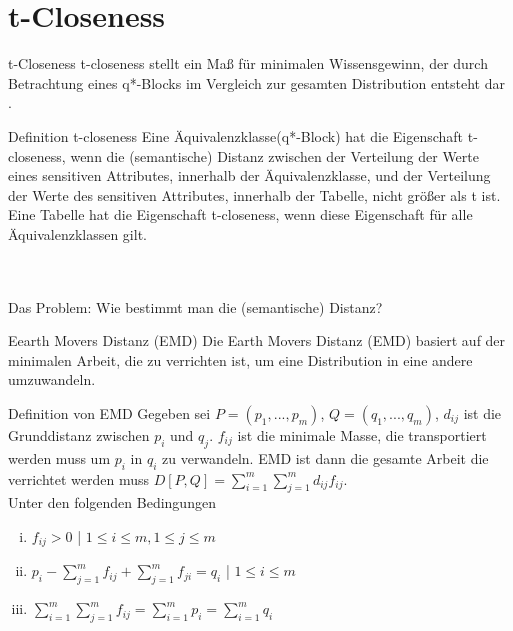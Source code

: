 \section{t-Closeness}

\begin{frame}{t-Closeness}
	t-closeness stellt ein Maß für minimalen Wissensgewinn, der durch Betrachtung eines q*-Blocks im Vergleich zur gesamten Distribution entsteht dar \cite{kltHauf}.
	\begin{block}{Definition t-closeness}
		Eine Äquivalenzklasse(q*-Block) hat die Eigenschaft t-closeness, wenn die (semantische) Distanz zwischen der Verteilung der Werte eines sensitiven Attributes, innerhalb der Äquivalenzklasse, und der Verteilung der Werte des sensitiven Attributes, innerhalb der Tabelle, nicht größer als t ist. Eine Tabelle hat die Eigenschaft t-closeness, wenn diese Eigenschaft für alle Äquivalenzklassen gilt.	
	\end{block}
	\ \\
	\ \\ 
	Das Problem: Wie bestimmt man die (semantische) Distanz?
\end{frame}

\begin{frame}{Eearth Movers Distanz (EMD)}
	Die Earth Movers Distanz (EMD)  basiert auf der minimalen Arbeit, die zu verrichten ist, um eine Distribution in eine andere umzuwandeln.
	\begin{block}{Definition von EMD \cite{Li2007t-closseness}}
		Gegeben sei $P=(p_1,...,p_m)$, $Q=(q_1,...,q_m)$, $d_{ij}$ ist die Grunddistanz zwischen $p_i$ und $q_j$. $f_{ij}$ ist die minimale Masse, die transportiert werden muss um $p_i$ in $q_i$ zu verwandeln. EMD ist dann die gesamte Arbeit die verrichtet werden muss $D[P,Q] = \sum_{i=1}^m \sum_{j=1}^m d_{ij} f_{ij}$.\\
		Unter den folgenden Bedingungen
		\begin{enumerate}[i)]
			\item $f_{ij}>0$ | $1\le i \le m, 1\le j \le m$		
			\item $p_i - \sum_{j=1}^{m}f_{ij} +\sum_{j=1}^{m}f_{ji} = q_i$ | $1 \le i \le m$
			\item $\sum_{i=1}^{m}\sum_{j=1}^{m} f_{ij} = \sum_{i=1}^{m} p_i = \sum_{i=1}^{m} q_i$ 
		\end{enumerate}
	\end{block}
\end{frame}

